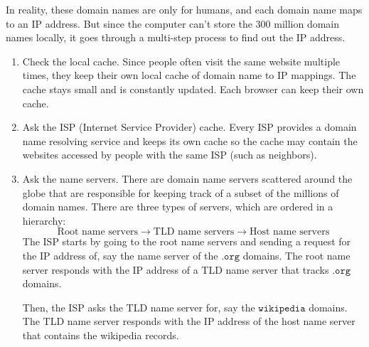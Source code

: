 \documentclass[a4paper, 12pt]{report}
\theoremstyle{remark}
\theoremstyle{definition}
\begin{document}
In reality, these domain names are only for humans, and each domain name maps to an IP address. But since the computer can't store the 300 million domain names locally, it goes through a multi-step process to find out the IP address. 

\begin{enumerate}
    \item Check the local cache. Since people often visit the same website multiple times, they keep their own local cache of domain name to IP mappings. The cache stays small and is constantly updated. Each browser can keep their own cache. 
    \item Ask the ISP (Internet Service Provider) cache. Every ISP provides a domain name resolving service and keeps its own cache so the cache may contain the websites accessed by people with the same ISP (such as neighbors).  
    \item Ask the name servers. There are domain name servers scattered around the globe that are responsible for keeping track of a subset of the millions of domain names. There are three types of servers, which are ordered in a hierarchy: 
    \[\text{Root name servers} \rightarrow \text{TLD name servers} \rightarrow \text{Host name servers}\]
    The ISP starts by going to the root name servers and sending a request for the IP address of, say the name server of the $\texttt{.org}$ domains. The root name server responds with the IP address of a TLD name server that tracks $\texttt{.org}$ domains. 
    \begin{center}
    \end{center}
    Then, the ISP asks the TLD name server for, say the $\texttt{wikipedia}$ domains. The TLD name server responds with the IP address of the host name server that contains the wikipedia records.
    \begin{center}
\end{center}
\end{enumerate}
\end{document}
